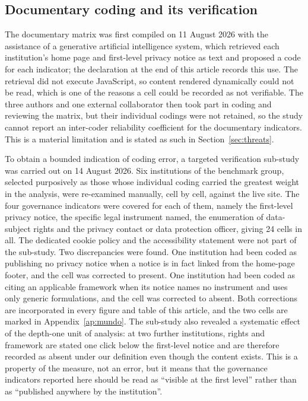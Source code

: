 \documentclass[]{interact}
\begin{document}
\subsection{Documentary coding and its verification}\label{sec:methods-coding}

The documentary matrix was first compiled on 11 August 2026 with the assistance of a generative artificial intelligence system, which retrieved each institution's home page and first-level privacy notice as text and proposed a code for each indicator; the declaration at the end of this article records this use. The retrieval did not execute JavaScript, so content rendered dynamically could not be read, which is one of the reasons a cell could be recorded as not verifiable. The three authors and one external collaborator then took part in coding and reviewing the matrix, but their individual codings were not retained, so the study cannot report an inter-coder reliability coefficient for the documentary indicators. This is a material limitation and is stated as such in Section~\ref{sec:threats}.

To obtain a bounded indication of coding error, a targeted verification sub-study was carried out on 14 August 2026. Six institutions of the benchmark group, selected purposively as those whose individual coding carried the greatest weight in the analysis, were re-examined manually, cell by cell, against the live site. The four governance indicators were covered for each of them, namely the first-level privacy notice, the specific legal instrument named, the enumeration of data-subject rights and the privacy contact or data protection officer, giving 24 cells in all. The dedicated cookie policy and the accessibility statement were not part of the sub-study. Two discrepancies were found. One institution had been coded as publishing no privacy notice when a notice is in fact linked from the home-page footer, and the cell was corrected to present. One institution had been coded as citing an applicable framework when its notice names no instrument and uses only generic formulations, and the cell was corrected to absent. Both corrections are incorporated in every figure and table of this article, and the two cells are marked in Appendix~\ref{ap:mundo}. The sub-study also revealed a systematic effect of the depth-one unit of analysis: at two further institutions, rights and framework are stated one click below the first-level notice and are therefore recorded as absent under our definition even though the content exists. This is a property of the measure, not an error, but it means that the governance indicators reported here should be read as ``visible at the first level'' rather than as ``published anywhere by the institution''.
\end{document}
